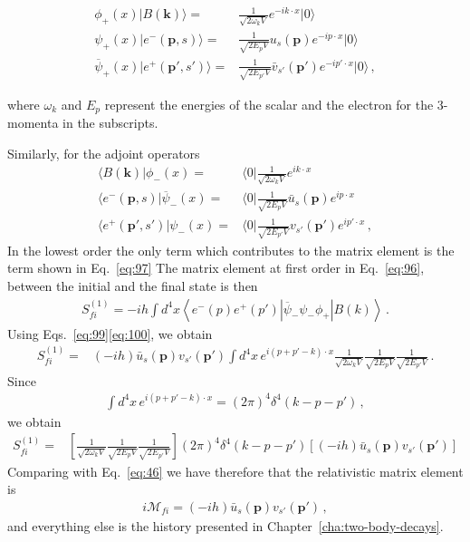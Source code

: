 \begin{align}
  \label{eq:99}
  \phi_+(x)|B(\mathbf{k})\rangle=&\frac{1}{\sqrt{2 \omega_k V}}e^{-i k\cdot x}|0\rangle\nonumber\\
  \psi_+(x)|e^-(\mathbf{p},s)\rangle=&\frac{1}{\sqrt{2 E_p V}}u_s(\mathbf{p})e^{-i p\cdot x}|0\rangle\nonumber\\
  \overline{\psi}_+(x)|e^+(\mathbf{p}',s')\rangle=&\frac{1}{\sqrt{2 E_{p'} V}}\bar{v}_{s'}(\mathbf{p}')e^{-i p'\cdot x}|0\rangle\,,
\end{align}

where $\omega_k$ and $E_p$ represent the energies of the scalar and the electron for the 3-momenta in the subscripts.

Similarly, for the adjoint operators
\begin{align}
  \label{eq:100}
   \langle B(\mathbf{k})|\phi_-(x)=&\langle0|\frac{1}{\sqrt{2 \omega_k V}}e^{i k\cdot x}\nonumber\\
  \langle e^-(\mathbf{p},s)|\overline{\psi}_-(x)=&\langle0|\frac{1}{\sqrt{2 E_p V}}\bar{u}_s(\mathbf{p})e^{i p\cdot x}\nonumber\\
  \langle e^+(\mathbf{p}',s')|\psi_-(x)=&\langle0|\frac{1}{\sqrt{2 E_{p'} V}}v_{s'}(\mathbf{p}')e^{i p'\cdot x}\,,
\end{align}
In the lowest order the only term which contributes to the matrix element is the term shown in Eq.~\eqref{eq:97}
The matrix element at first order in Eq.~\eqref{eq:96}, between the initial and the final state is then
\begin{align}
  S_{fi}^{(1)}=-i h \int d^4x\left\langle e^-(p)e^+(p')\left|\overline{\psi}_-\psi_-\phi_+\right|B(k)\right\rangle\,.
\end{align}
Using Eqs.~\eqref{eq:99}\eqref{eq:100}, we obtain
\begin{align}
  S_{fi}^{(1)}=&(-i h)\bar{u}_s(\mathbf{p}) v_{s'}(\mathbf{p}')
\int d^4x\,e^{i(p+p'-k)\cdot x}\frac{1}{\sqrt{2\omega_k V}}\frac{1}{\sqrt{2E_p V}}\frac{1}{\sqrt{2E_{p'} V}}\,.
\end{align}
Since
\begin{align}
  \int d^4x\,e^{i(p+p'-k)\cdot x}=(2\pi)^4\delta^4(k-p-p')\,,
\end{align}
we obtain
\begin{align}
  S_{fi}^{(1)}=&\left[\frac{1}{\sqrt{2\omega_k V}}\frac{1}{\sqrt{2E_p V}}\frac{1}{\sqrt{2E_{p'} V}}\right]
(2\pi)^4\delta^4(k-p-p')\left[(-i h)\bar{u}_s(\mathbf{p}) v_{s'}(\mathbf{p}')\right]
\end{align}
Comparing with Eq.~\eqref{eq:46} we have therefore that the relativistic matrix element is
\begin{align}
  i\mathcal{M}_{fi}=(-i h)\bar{u}_s(\mathbf{p}) v_{s'}(\mathbf{p}')\,,
\end{align}
and everything else is the history presented in Chapter~\ref{cha:two-body-decays}. 

